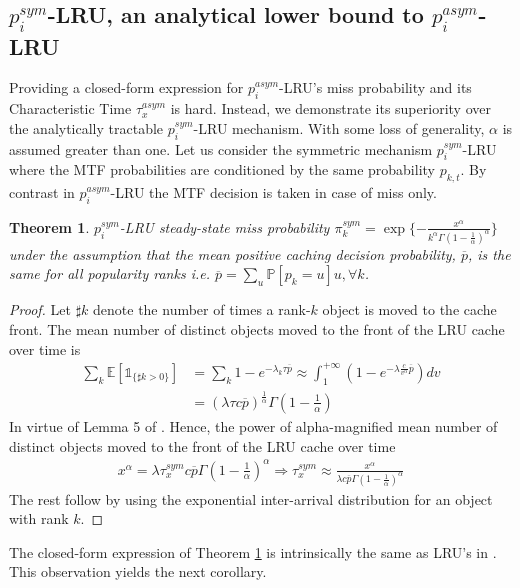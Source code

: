 \documentclass[conference]{IEEEtran}
\newtheorem{theorem}{Theorem}
\begin{document}
\subsection{$p_i^{sym}$-LRU, an analytical lower bound to $p_i^{asym}$-LRU}
\label{subsec:lower_bound}
Providing a closed-form expression for $p_i^{asym}$-LRU's 
miss probability and its Characteristic Time  $\tau^{asym}_x$
is hard. Instead, we demonstrate its superiority over the 
analytically tractable $p_i^{sym}$-LRU mechanism.
With some loss of generality, $\alpha$ is assumed greater 
than one. Let us consider the symmetric mechanism 
$p_i^{sym}$-LRU where the MTF probabilities are conditioned  
by the same probability $p_{k,t}$. By contrast in 
$p_i^{asym}$-LRU the MTF decision is taken in case of miss 
only.
\begin{theorem} \label{theo:pi_sym_LRU}
$p_i^{sym}$-LRU steady-state miss probability
$\pi^{sym}_{k}  =  \exp\{-\frac{x^{\alpha}}{k^{\alpha}\Gamma (1 - 
\frac{1}{\alpha} )^{\alpha}}\}$
under the assumption that the mean positive caching decision 
probability, $\overline{p}$, is the same for all popularity 
ranks i.e. $\overline{p} = \sum \limits_u \mathbb{P}\left[p_k 
= u \right] u, \forall k$.
\end{theorem}

\begin{proof} 
Let $\sharp k$ denote the number of times a rank-$k$ object 
is moved to the cache front. The mean number of distinct objects moved 
to the front of the LRU cache over time is
\begin{align}
\sum \limits_k \mathbb{E}\left[\mathds{1}_{\{\sharp k > 0\}}\right] &= \sum \limits_k 1 - e^{-\lambda_k \tau \overline{p}}\approx \int^{+\infty}_1(1 - e^{-\lambda \frac{c}{v^{\alpha}} \overline{p}} )dv \nonumber  \\
&= (\lambda \tau c \overline{p})^{\frac{1}{\alpha}}\Gamma \left( 1 - \frac{1}{\alpha} \right)\nonumber 
\end{align}
In virtue of Lemma 5 of \cite{Jelenkovic:2004:OLC:1024662.1024670}.
Hence, the power of alpha-magnified mean number of distinct objects moved to the front of the LRU cache over time 
\begin{align}
x^{\alpha} = \lambda \tau^{sym}_x c \overline{p}\Gamma \left( 1 - \frac{1}{\alpha} \right)^{\alpha} \Rightarrow
\tau^{sym}_x \approx  
\frac{x^{\alpha}} {\lambda c \overline{p} \Gamma 
\left( 1 - \frac{1}{\alpha} \right)^{\alpha}}\nonumber
\end{align}
The rest follow by using the exponential inter-arrival distribution
for an object with rank $k$.
\end{proof}
The closed-form expression of Theorem \ref{theo:pi_sym_LRU} is intrinsically the same as LRU's in \cite{Carofiglio:2013:PBS:2542828.2542992}. This observation yields the next corollary.
\end{document}
